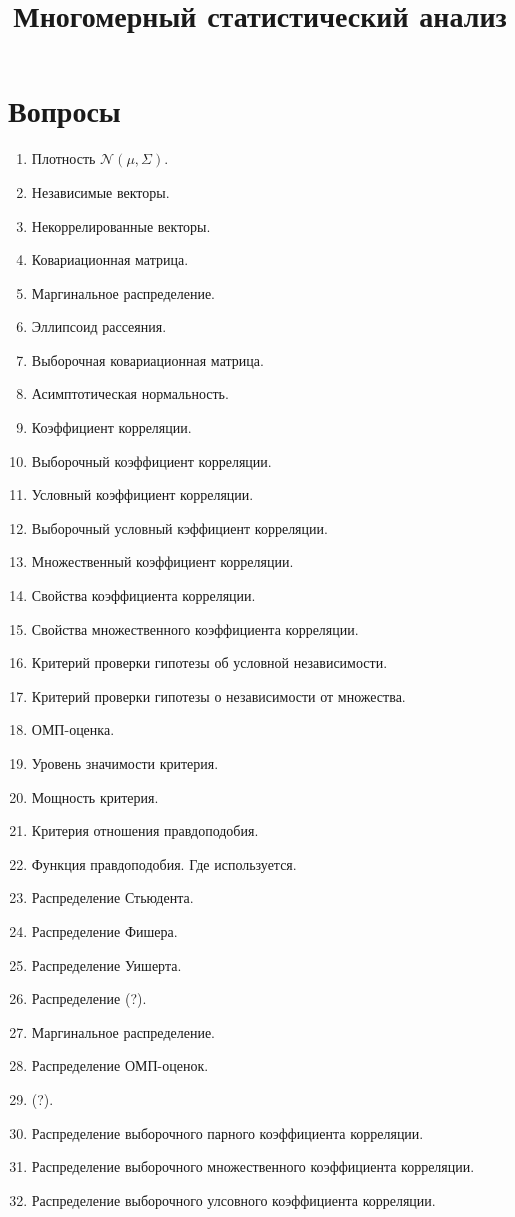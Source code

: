 \documentclass[a4paper]{article}
\title{Многомерный статистический анализ}
\begin{document}
\maketitle

\section*{Вопросы}

\begin{enumerate}
	\item{Плотность $\mathcal{N}(\mu, \Sigma)$.}
	\item{Независимые векторы.}
	\item{Некоррелированные векторы.}
	\item{Ковариационная матрица.}
	\item{Маргинальное распределение.}
	\item{Эллипсоид рассеяния.}
	\item{Выборочная ковариационная матрица.}
	\item{Асимптотическая нормальность.}
	\item{Коэффициент корреляции.}
	\item{Выборочный коэффициент корреляции.}
	\item{Условный коэффициент корреляции.}
	\item{Выборочный условный кэффициент корреляции.}
	\item{Множественный коэффициент корреляции.}
	\item{Свойства коэффициента корреляции.}
	\item{Свойства множественного коэффициента корреляции.}
	\item{Критерий проверки гипотезы об условной независимости.}
	\item{Критерий проверки гипотезы о независимости от множества.}
	\item{ОМП-оценка.}
	\item{Уровень значимости критерия.}
	\item{Мощность критерия.}
	\item{Критерия отношения правдоподобия.}
	\item{Функция правдоподобия. Где используется.}
	\item{Распределение Стьюдента.}
	\item{Распределение Фишера.}
	\item{Распределение Уишерта.}
	\item{Распределение (?).}
	\item{Маргинальное распределение.}
	\item{Распределение ОМП-оценок.}
	\item{(?).}
	\item{Распределение выборочного парного коэффициента корреляции.}
	\item{Распределение выборочного множественного коэффициента корреляции.}
	\item{Распределение выборочного улсовного коэффициента корреляции.}
\end{enumerate}
\end{document}
